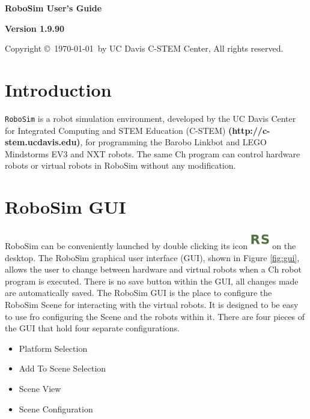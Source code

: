 \documentclass{article}
\begin{document}
\begin{center}
{\Huge\sf\bf RoboSim User's Guide}\\
\vspace*{2.5cm}
\begin{center}
\end{center}
{\Large\bf Version 1.9.90}
\vspace{4in}

Copyright \copyright\ \today\ by UC Davis C-STEM Center, All rights reserved.

\end{center}

\newpage
\tableofcontents
\newpage

%
%
\section{Introduction}
\texttt{RoboSim} is a robot simulation environment, developed by the UC Davis
Center for Integrated Computing and STEM Education (C-STEM) {\color{blue} \bf
(http://c-stem.ucdavis.edu)}, for programming the Barobo Linkbot and LEGO
Mindstorms EV3 and NXT robots.  The same Ch program  can control hardware robots
or virtual robots in RoboSim without any modification.

%
%
\section{RoboSim GUI}
\label{sec:gui}
RoboSim can be conveniently launched by double clicking its icon
\includegraphics[height=24pt]{pictures/robosim} on the desktop.  The RoboSim
graphical user interface (GUI), shown in Figure \ref{fig:gui}, allows the user
to change between hardware and virtual robots when a Ch robot program is
executed.  There is no save button within the GUI, all changes made are
automatically saved.  The RoboSim GUI is the place to configure the RoboSim
Scene for interacting with the virtual robots.  It is designed to be easy to use
fro configuring the Scene and the robots within it.  There are four pieces of
the GUI that hold four separate configurations.
\begin{itemize}
	\item Platform Selection
	\item Add To Scene Selection
	\item Scene View
	\item Scene Configuration
\end{itemize}
\end{document}
